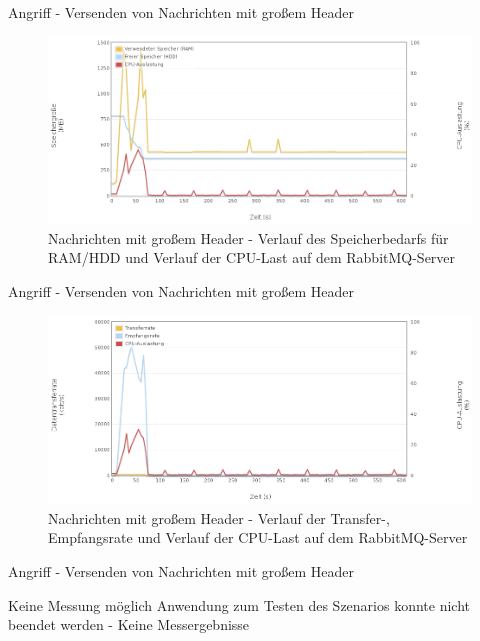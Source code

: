 \documentclass[10pt]{beamer}
\begin{document}
\begin{frame}{Angriff - Versenden von Nachrichten mit großem Header}
\begin{figure}[!htb]
	\centering
	\includegraphics[width=\textwidth]{img/header/header_server1.png}
	\caption{\centering Nachrichten mit großem Header - Verlauf des Speicherbedarfs für RAM/HDD und Verlauf der CPU-Last auf dem RabbitMQ-Server}
	\label{fig:header-server1}
\end{figure}
\end{frame}
	
\begin{frame}{Angriff - Versenden von Nachrichten mit großem Header}	
\begin{figure}[!htb]
	\centering
	\includegraphics[width=\textwidth]{img/header/header_server2.png}
	\caption{\centering Nachrichten mit großem Header - Verlauf der Transfer-, Empfangsrate und Verlauf der CPU-Last auf dem RabbitMQ-Server}
	\label{fig:header-server2}
\end{figure}
\end{frame}

\begin{frame}{Angriff - Versenden von Nachrichten mit großem Header}	
\begin{block}{Keine Messung möglich}
Anwendung zum Testen des Szenarios konnte nicht beendet werden - Keine Messergebnisse
\end{block}
\end{frame}
\end{document}

